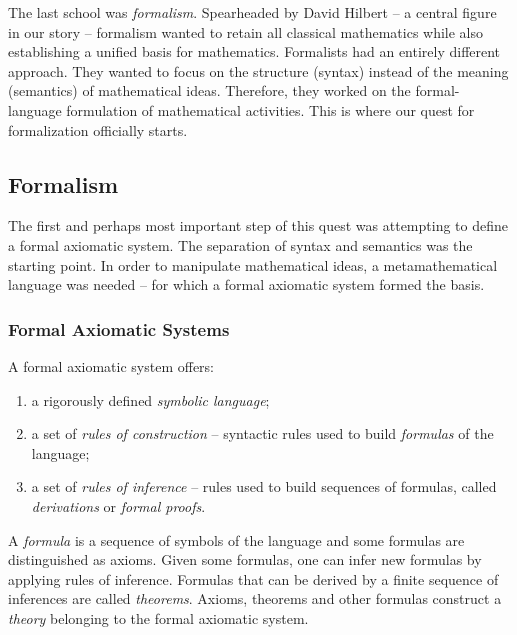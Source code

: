 \documentclass[a4paper, 12pt]{article}
\theoremstyle{definition}
\begin{document}
    The last school was \textit{formalism}. Spearheaded by David Hilbert -- a central figure in our story -- formalism wanted to retain 
    all classical mathematics while also establishing a unified basis for mathematics. Formalists had an entirely different approach. They wanted to focus on the 
    structure (syntax) instead of the meaning (semantics) of mathematical ideas. Therefore, 
    they worked on the formal-language formulation of mathematical activities. This is where our quest for formalization 
    officially starts. 

    \subsection*{Formalism}
    The first and perhaps most important step of this quest was attempting to define a formal axiomatic system. 
    The separation of syntax and semantics was the starting point. In order to manipulate mathematical ideas, 
    a metamathematical language was needed -- for which a formal axiomatic system formed the basis.
    \vspace{-0.75 em}
    \subsubsection*{Formal Axiomatic Systems}
    \vspace{-0.5 em}
    A formal axiomatic system offers:
    \vspace{-1 em}
    \begin{enumerate}
        \item a rigorously defined \textit{symbolic language};
        \vspace{-0.5 em}
        \item a set of \textit{rules of construction} -- syntactic rules used to build \textit{formulas} of the language;
        \vspace{-0.5 em}
        \item a set of \textit{rules of inference} -- rules used to build sequences of formulas, called \emph{derivations} or \emph{formal proofs}.
    \end{enumerate}

    A \textit{formula} is a sequence of symbols of the language and some formulas are distinguished as axioms. Given some formulas, 
    one can infer new formulas by applying rules of inference. Formulas that can be derived by 
    a finite sequence of inferences are called \textit{theorems}. Axioms, theorems and other formulas construct a \textit{theory} belonging to the 
    formal axiomatic system. 
\end{document}
